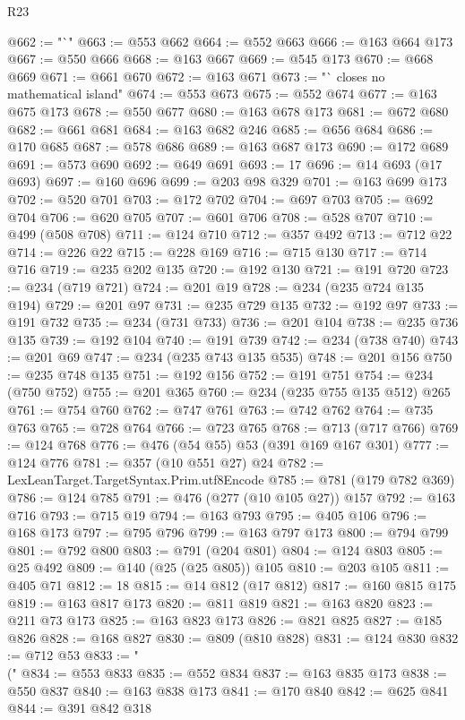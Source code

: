 \begin{lexlean}{R23}
\begin{coremodule}
@662 := "`"
@663 := @553 @662
@664 := @552 @663
@666 := @163 @664 @173
@667 := @550 @666
@668 := @163 @667
@669 := @545 @173
@670 := @668 @669
@671 := @661 @670
@672 := @163 @671
@673 := "` closes no mathematical island"
@674 := @553 @673
@675 := @552 @674
@677 := @163 @675 @173
@678 := @550 @677
@680 := @163 @678 @173
@681 := @672 @680
@682 := @661 @681
@684 := @163 @682 @246
@685 := @656 @684
@686 := @170 @685
@687 := @578 @686
@689 := @163 @687 @173
@690 := @172 @689
@691 := @573 @690
@692 := @649 @691
@693 := 17
@696 := @14 @693 (@17 @693)
@697 := @160 @696
@699 := @203 @98 @329
@701 := @163 @699 @173
@702 := @520 @701
@703 := @172 @702
@704 := @697 @703
@705 := @692 @704
@706 := @620 @705
@707 := @601 @706
@708 := @528 @707
@710 := @499 (@508 @708)
@711 := @124 @710
@712 := @357 @492
@713 := @712 @22
@714 := @226 @22
@715 := @228 @169
@716 := @715 @130
@717 := @714 @716
@719 := @235 @202 @135
@720 := @192 @130
@721 := @191 @720
@723 := @234 (@719 @721)
@724 := @201 @19
@728 := @234 (@235 @724 @135 @194)
@729 := @201 @97
@731 := @235 @729 @135
@732 := @192 @97
@733 := @191 @732
@735 := @234 (@731 @733)
@736 := @201 @104
@738 := @235 @736 @135
@739 := @192 @104
@740 := @191 @739
@742 := @234 (@738 @740)
@743 := @201 @69
@747 := @234 (@235 @743 @135 @535)
@748 := @201 @156
@750 := @235 @748 @135
@751 := @192 @156
@752 := @191 @751
@754 := @234 (@750 @752)
@755 := @201 @365
@760 := @234 (@235 @755 @135 @512) @265
@761 := @754 @760
@762 := @747 @761
@763 := @742 @762
@764 := @735 @763
@765 := @728 @764
@766 := @723 @765
@768 := @713 (@717 @766)
@769 := @124 @768
@776 := @476 (@54 @55) @53 (@391 @169 @167 @301)
@777 := @124 @776
@781 := @357 (@10 @551 @27) @24
@782 := LexLeanTarget.TargetSyntax.Prim.utf8Encode
@785 := @781 (@179 @782 @369)
@786 := @124 @785
@791 := @476 (@277 (@10 @105 @27)) @157
@792 := @163 @716
@793 := @715 @19
@794 := @163 @793
@795 := @405 @106
@796 := @168 @173
@797 := @795 @796
@799 := @163 @797 @173
@800 := @794 @799
@801 := @792 @800
@803 := @791 (@204 @801)
@804 := @124 @803
@805 := @25 @492
@809 := @140 (@25 (@25 @805)) @105
@810 := @203 @105
@811 := @405 @71
@812 := 18
@815 := @14 @812 (@17 @812)
@817 := @160 @815 @175
@819 := @163 @817 @173
@820 := @811 @819
@821 := @163 @820
@823 := @211 @73 @173
@825 := @163 @823 @173
@826 := @821 @825
@827 := @185 @826
@828 := @168 @827
@830 := @809 (@810 @828)
@831 := @124 @830
@832 := @712 @53
@833 := "\\("
@834 := @553 @833
@835 := @552 @834
@837 := @163 @835 @173
@838 := @550 @837
@840 := @163 @838 @173
@841 := @170 @840
@842 := @625 @841
@844 := @391 @842 @318

\end{coremodule}
\end{lexlean}

